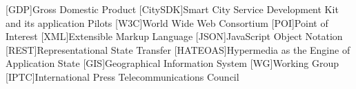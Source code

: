 [GDP]{Gross Domestic Product}
[CitySDK]{Smart City Service Development Kit and its application Pilots}
[W3C]{World Wide Web Consortium}
[POI]{Point of Interest}
[XML]{Extensible Markup Language}
[JSON]{JavaScript Object Notation}
[REST]{Representational State Transfer}
[HATEOAS]{Hypermedia as the Engine of Application State}
[GIS]{Geographical Information System}
[WG]{Working Group}
[IPTC]{International Press Telecommunications Council}
